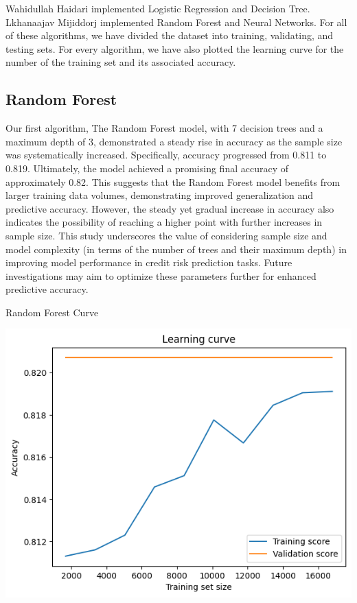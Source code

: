 \documentclass[nohyperref]{article}
\theoremstyle{plain}
\theoremstyle{definition}
\theoremstyle{remark}
\begin{document}
Wahidullah Haidari implemented Logistic Regression and Decision Tree. Lkhanaajav Mijiddorj implemented Random Forest and Neural Networks. For all of these algorithms, we have divided the dataset into training, validating, and testing sets. For every algorithm, we have also plotted the learning curve for the number of the training set and its associated accuracy.

\subsection{Random Forest}
Our first algorithm, The Random Forest model, with 7 decision trees and a maximum depth of 3, demonstrated a steady rise in accuracy as the sample size was systematically increased. Specifically, accuracy progressed from 0.811 to 0.819. Ultimately, the model achieved a promising final accuracy of approximately 0.82. This suggests that the Random Forest model benefits from larger training data volumes, demonstrating improved generalization and predictive accuracy. However, the steady yet gradual increase in accuracy also indicates the possibility of reaching a higher point with further increases in sample size. This study underscores the value of considering sample size and model complexity (in terms of the number of trees and their maximum depth) in improving model performance in credit risk prediction tasks. Future investigations may aim to optimize these parameters further for enhanced predictive accuracy.

Random Forest Curve

\includegraphics[scale=0.5]{Random Forest.png}
\end{document}
